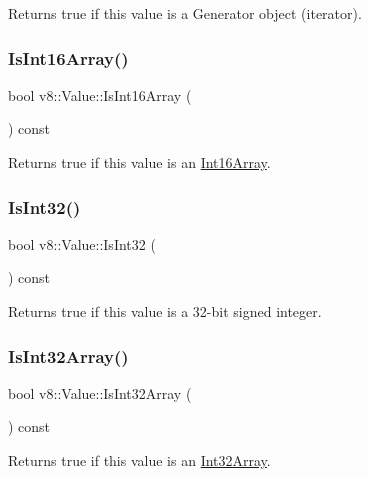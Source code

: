 Returns true if this value is a Generator object (iterator). \mbox{\label{classv8_1_1Value_a8db779f4ac104540e63d78e73d424195}} 
\subsubsection{\texorpdfstring{Is\+Int16\+Array()}{IsInt16Array()}}
{\footnotesize\ttfamily bool v8\+::\+Value\+::\+Is\+Int16\+Array (\begin{DoxyParamCaption}{ }\end{DoxyParamCaption}) const}

Returns true if this value is an \mbox{\hyperlink{classv8_1_1Int16Array}{Int16\+Array}}. \mbox{\label{classv8_1_1Value_ad5d58df1d978b4d9875eb97b3bebfc29}} 
\subsubsection{\texorpdfstring{Is\+Int32()}{IsInt32()}}
{\footnotesize\ttfamily bool v8\+::\+Value\+::\+Is\+Int32 (\begin{DoxyParamCaption}{ }\end{DoxyParamCaption}) const}

Returns true if this value is a 32-\/bit signed integer. \mbox{\label{classv8_1_1Value_afd14729579f9768a7d3f8bc3db6c1d28}} 
\subsubsection{\texorpdfstring{Is\+Int32\+Array()}{IsInt32Array()}}
{\footnotesize\ttfamily bool v8\+::\+Value\+::\+Is\+Int32\+Array (\begin{DoxyParamCaption}{ }\end{DoxyParamCaption}) const}

Returns true if this value is an \mbox{\hyperlink{classv8_1_1Int32Array}{Int32\+Array}}. \mbox{\label{classv8_1_1Value_ad9c2858387a0cafe3628f0533a9bbf6a}} 
